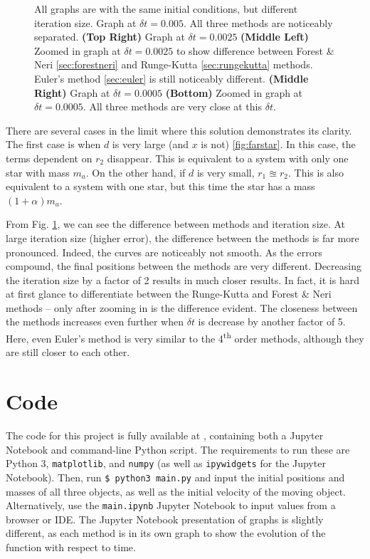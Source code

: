 \documentclass[preprint,titlepage,preprintnumbers,amsmath,amssymb,aps,11pt]{revtex4-2}
\begin{document}
\begin{figure}
    \caption{All graphs are with the same initial conditions, but different iteration size. Graph at $\delta t=0.005$. All three methods are noticeably separated. {\bf(Top Right)} Graph at $\delta t=0.0025$ {\bf(Middle Left)} Zoomed in graph at $\delta t=0.0025$ to show difference between Forest \& Neri \ref{sec:forestneri} and Runge-Kutta \ref{sec:rungekutta} methods. Euler's method \ref{sec:euler} is still noticeably different. {\bf(Middle Right)} Graph at $\delta t=0.0005$ {\bf(Bottom)} Zoomed in graph at $\delta t=0.0005$. All three methods are very close at this $\delta t$.}
    \label{fig:diffbetweenmethods}
\end{figure}


There are several cases in the limit where this solution demonstrates its clarity. The first case is when $d$ is very large (and $x$ is not) \ref{fig:farstar}. In this case, the terms dependent on $r_2$ disappear. This is equivalent to a system with only one star with mass $m_a$. On the other hand, if $d$ is very small, $r_1\approxeq r_2$. This is also equivalent to a system with one star, but this time the star has a mass $(1+\alpha)m_a$.

From Fig. \ref{fig:diffbetweenmethods}, we can see the difference between methods and iteration size. At large iteration size (higher error), the difference between the methods is far more pronounced. Indeed, the curves are noticeably not smooth. As the errors compound, the final positions between the methods are very different. Decreasing the iteration size by a factor of 2 results in much closer results. In fact, it is hard at first glance to differentiate between the Runge-Kutta and Forest \& Neri methods -- only after zooming in is the difference evident. The closeness between the methods increases even further when $\delta t$ is decrease by another factor of 5. Here, even Euler's method is very similar to the 4\textsuperscript{th} order methods, although they are still closer to each other.


\appendix
\section{Code}\label{sec:code}
The code for this project is fully available at \href{https://github.com/jasperswallen/PHYS304-Project}{},
containing both a Jupyter Notebook and command-line Python script. The requirements to run these are Python 3, \texttt{matplotlib}, and \texttt{numpy} (as well as \texttt{ipywidgets} for the Jupyter Notebook). Then, run \texttt{\$ python3 main.py} and input the initial positions and masses of all three objects, as well as the initial velocity of the moving object. Alternatively, use the \texttt{main.ipynb} Jupyter Notebook to input values from a browser or IDE. The Jupyter Notebook presentation of graphs is slightly different, as each method is in its own graph to show the evolution of the function with respect to time.
\end{document}
